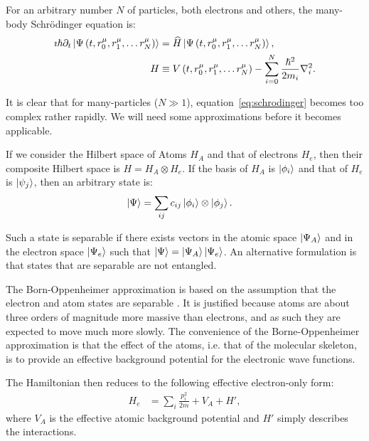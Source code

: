 For an arbitrary number $N$ of particles, both electrons and others, the many-body Schr\"odinger equation is:
\begin{align}
 \imath \hslash \partial_t\ket{\Psi\left(t, r_0^\mu, r_1^\mu, \ldots r_N^\mu\right)} &= \widehat{H} \ket{\Psi\left(t, r_0^\mu, r_1^\mu, \ldots r_N^\mu\right)} \label{eq:schrodinger}, \\
 H &\equiv V\left(t, r_0^\mu, r_1^\mu, \ldots r_N^\mu\right) - \sum_{i=0}^N \frac{\hslash^2}{2m_i} \nabla_i^2.
\end{align}

It is clear that for many-particles ($N\gg 1$), equation~\ref{eq:schrodinger} becomes too complex rather rapidly. We will need some approximations before it becomes applicable.

If we consider the Hilbert space of Atoms $H_A$ and that of electrons $H_e$, then their composite Hilbert space is $H = H_A \otimes H_e$. If the basis of $H_A$ is $\ket{\phi_i}$ and that of $H_e$ is $\ket{\psi_j}$, then an arbitrary state is:
\begin{align}
\ket{\Psi} &= \sum_{ij} c_{ij} \ket{\phi_i} \otimes \ket{\phi_j}.
\end{align}

Such a state is separable if there exists vectors in the atomic space $\ket{\Psi_A}$ and in the electron space $\ket{\Psi_e}$ such that $\ket{\Psi} = \ket{\Psi_A} \ket{\Psi_e}$. An alternative formulation is that states that are separable are not entangled.

The Born-Oppenheimer approximation is based on the assumption that the electron and atom  states are separable \cite{mattuck}. It is justified because atoms are about three orders of magnitude more massive than electrons, and as such they are expected to move much more slowly. The convenience of the Borne-Oppenheimer approximation is that the effect of the atoms, i.e. that of the molecular skeleton, is to provide an effective background potential for the electronic wave functions.

The Hamiltonian then reduces to the following effective electron-only form:
\begin{align}
H_e &= \sum_i \frac{p_i^2}{2m} + V_A + H',
\end{align}
where $V_A$ is the effective atomic background potential and $H'$ simply describes the interactions.

